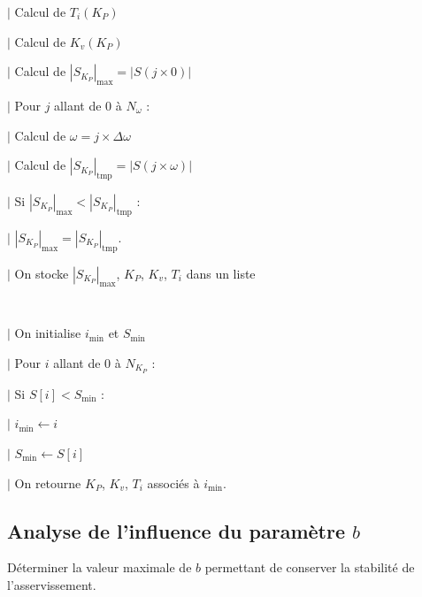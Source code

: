 \documentclass[10pt,fleqn]{article} %
\begin{document}
\noindent \hspace{.8cm} $|$ Calcul de $T_i \left( K_P\right)$ 

\noindent \hspace{.8cm} $|$ Calcul de $K_v\left( K_P\right)$ 

\noindent \hspace{.8cm} $|$ Calcul de $\left| S_{K_P} \right|_{\text{max}}=\left| S\left( j \times 0\right) \right|$

\noindent \hspace{.8cm} $|$ Pour $j$ allant de 0 à $N_{\omega}$ :  

\noindent \hspace{1.2cm} $|$ Calcul de $\omega=j\times \Delta \omega$ 

\noindent \hspace{1.2cm} $|$ Calcul de $\left| S_{K_P} \right|_{\text{tmp}}=\left| S\left( j \times \omega \right) \right|$

\noindent \hspace{1.2cm} $|$ Si $\left| S_{K_P} \right|_{\text{max}}< \left| S_{K_P} \right|_{\text{tmp}}$ :

\noindent \hspace{1.6cm} $|$ $\left| S_{K_P} \right|_{\text{max}}= \left| S_{K_P} \right|_{\text{tmp}}$.

\noindent \hspace{.8cm} $|$ On stocke $\left| S_{K_P} \right|_{\text{max}}$, $K_P$, $K_v$, $T_i$ dans un liste
\subparagraph{}
~\\


\noindent \hspace{.4cm} $|$ On initialise $i_{\text{min}}$ et   $S_{\text{min}}$

\noindent \hspace{.4cm} $|$ Pour $i$ allant de 0 à $N_{K_P}$ :  

\noindent \hspace{.8cm} $|$ Si $S[i]<S_{\text{min}}$ :

\noindent \hspace{1.2cm} $|$ $i_{\text{min}}\leftarrow i$

\noindent \hspace{1.2cm} $|$ $S_{\text{min}}\leftarrow S[i]$

\noindent \hspace{.4cm} $|$ On retourne  $K_P$, $K_v$, $T_i$ associés à $i_{\text{min}}$.



\subsection{Analyse de l’influence du paramètre $b$}
\begin{obj}
Déterminer la valeur maximale de $b$ permettant de conserver la stabilité de l’asservissement.
\end{obj}
\end{document}
